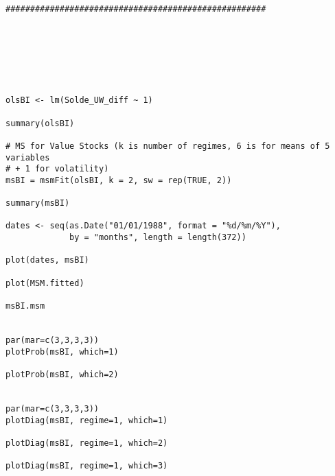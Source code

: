 \begin{lstlisting}
#####################################################







olsBI <- lm(Solde_UW_diff ~ 1)

summary(olsBI)

# MS for Value Stocks (k is number of regimes, 6 is for means of 5 variables
# + 1 for volatility)
msBI = msmFit(olsBI, k = 2, sw = rep(TRUE, 2))

summary(msBI)

dates <- seq(as.Date("01/01/1988", format = "%d/%m/%Y"),
             by = "months", length = length(372))

plot(dates, msBI)

plot(MSM.fitted)

msBI.msm


par(mar=c(3,3,3,3))
plotProb(msBI, which=1)

plotProb(msBI, which=2)


par(mar=c(3,3,3,3))
plotDiag(msBI, regime=1, which=1)

plotDiag(msBI, regime=1, which=2)

plotDiag(msBI, regime=1, which=3)

\end{lstlisting}